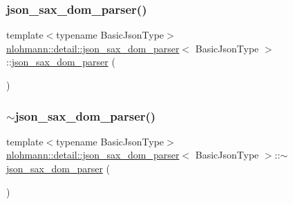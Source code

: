 \subsubsection{\texorpdfstring{json\_sax\_dom\_parser()}{json\_sax\_dom\_parser()}\hspace{0.1cm}{\footnotesize\ttfamily [3/3]}}
{\footnotesize\ttfamily template$<$typename Basic\+Json\+Type$>$ \\
\mbox{\hyperlink{classnlohmann_1_1detail_1_1json__sax__dom__parser}{nlohmann\+::detail\+::json\+\_\+sax\+\_\+dom\+\_\+parser}}$<$ Basic\+Json\+Type $>$\+::\mbox{\hyperlink{classnlohmann_1_1detail_1_1json__sax__dom__parser}{json\+\_\+sax\+\_\+dom\+\_\+parser}} (\begin{DoxyParamCaption}\item[{\mbox{\hyperlink{classnlohmann_1_1detail_1_1json__sax__dom__parser}{json\+\_\+sax\+\_\+dom\+\_\+parser}}$<$ Basic\+Json\+Type $>$ \&\&}]{ }\end{DoxyParamCaption})\hspace{0.3cm}{\ttfamily [default]}}

\mbox{\label{classnlohmann_1_1detail_1_1json__sax__dom__parser_a4b93deb5c1d716dcfb33b3ed8a00ac4d}} 
\subsubsection{\texorpdfstring{$\sim$json\_sax\_dom\_parser()}{~json\_sax\_dom\_parser()}}
{\footnotesize\ttfamily template$<$typename Basic\+Json\+Type$>$ \\
\mbox{\hyperlink{classnlohmann_1_1detail_1_1json__sax__dom__parser}{nlohmann\+::detail\+::json\+\_\+sax\+\_\+dom\+\_\+parser}}$<$ Basic\+Json\+Type $>$\+::$\sim$\mbox{\hyperlink{classnlohmann_1_1detail_1_1json__sax__dom__parser}{json\+\_\+sax\+\_\+dom\+\_\+parser}} (\begin{DoxyParamCaption}{ }\end{DoxyParamCaption})\hspace{0.3cm}{\ttfamily [default]}}



